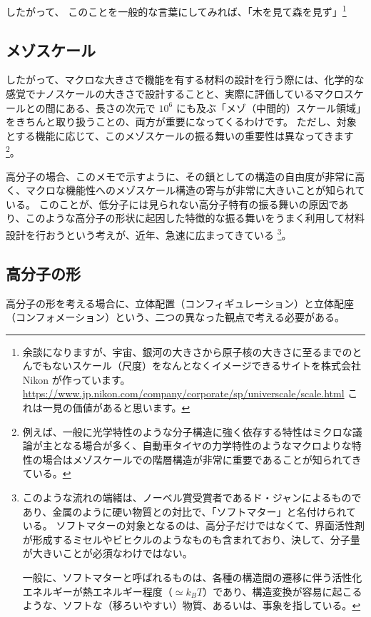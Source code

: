 \documentclass[uplatex,dvipdfmx,a4paper,11pt, titlepage]{jsarticle}
\begin{document}
したがって、
このことを一般的な言葉にしてみれば、「木を見て森を見ず」\footnote{余談になりますが、宇宙、銀河の大きさから原子核の大きさに至るまでのとんでもないスケール（尺度）をなんとなくイメージできるサイトを株式会社 Nikon が作っています。
	\url{https://www.jp.nikon.com/company/corporate/sp/universcale/scale.html}
	これは一見の価値があると思います。
}

\subsection{メゾスケール}

したがって、マクロな大きさで機能を有する材料の設計を行う際には、化学的な感覚でナノスケールの大きさで設計することと、実際に評価しているマクロスケールとの間にある、長さの次元で $10^6$ にも及ぶ「メゾ（中間的）スケール領域」をきちんと取り扱うことの、両方が重要になってくるわけです。
ただし、対象とする機能に応じて、このメゾスケールの振る舞いの重要性は異なってきます
\footnote
{
例えば、一般に光学特性のような分子構造に強く依存する特性はミクロな議論が主となる場合が多く、自動車タイヤの力学特性のようなマクロよりな特性の場合はメゾスケールでの階層構造が非常に重要であることが知られてきている。
}。

高分子の場合、このメモで示すように、その鎖としての構造の自由度が非常に高く、マクロな機能性へのメゾスケール構造の寄与が非常に大きいことが知られている。
このことが、低分子には見られない高分子特有の振る舞いの原因であり、このような高分子の形状に起因した特徴的な振る舞いをうまく利用して材料設計を行おうという考えが、近年、急速に広まってきている
\footnote
{
このような流れの端緒は、ノーベル賞受賞者であるド・ジャンによるものであり、金属のように硬い物質との対比で、「ソフトマター」と名付けられている。
ソフトマターの対象となるのは、高分子だけではなくて、界面活性剤が形成するミセルやビヒクルのようなものも含まれており、決して、分子量が大きいことが必須なわけではない。

一般に、ソフトマターと呼ばれるものは、各種の構造間の遷移に伴う活性化エネルギーが熱エネルギー程度（$\simeq k_B T$）であり、構造変換が容易に起こるような、ソフトな（移ろいやすい）物質、あるいは、事象を指している。
}。
\subsection{高分子の形}

高分子の形を考える場合に、立体配置（コンフィギュレーション）と立体配座（コンフォメーション）という、二つの異なった観点で考える必要がある。
\end{document}
